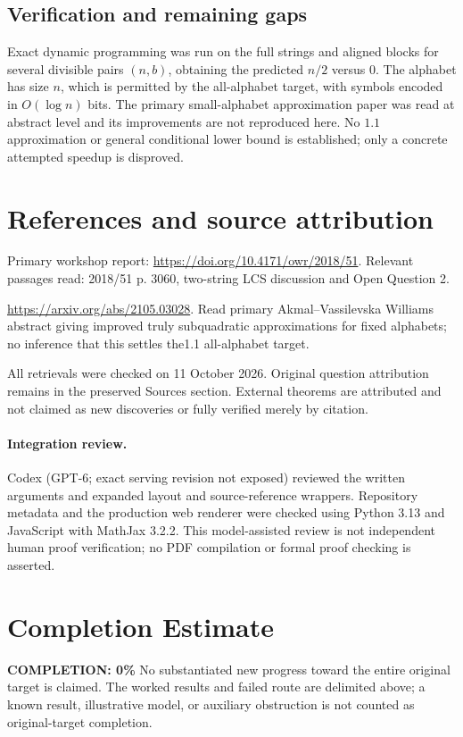 \documentclass[11pt]{article}
\begin{document}
\subsection{Verification and remaining gaps}
Exact dynamic programming was run on the full strings and aligned blocks for several divisible pairs $(n,b)$, obtaining the predicted $n/2$ versus 0. The alphabet has size $n$, which is permitted by the all-alphabet target, with symbols encoded in $O(\log n)$ bits. The primary small-alphabet approximation paper was read at abstract level and its improvements are not reproduced here. No $1.1$ approximation or general conditional lower bound is established; only a concrete attempted speedup is disproved.

\section{References and source attribution}
Primary workshop report: \url{https://doi.org/10.4171/owr/2018/51}. Relevant passages read: 2018/51 p. 3060, two-string LCS discussion and Open Question 2.

\url{https://arxiv.org/abs/2105.03028}. Read primary Akmal--Vassilevska Williams abstract giving improved truly subquadratic approximations for fixed alphabets; no inference that this settles the1.1 all-alphabet target.

All retrievals were checked on 11 October 2026. Original question attribution remains in the preserved Sources section. External theorems are attributed and not claimed as new discoveries or fully verified merely by citation.


\paragraph{Integration review.} Codex (GPT-6; exact serving revision not exposed) reviewed the written arguments and expanded layout and source-reference wrappers. Repository metadata and the production web renderer were checked using Python 3.13 and JavaScript with MathJax 3.2.2. This model-assisted review is not independent human proof verification; no PDF compilation or formal proof checking is asserted.

\section{Completion Estimate}
\noindent\textbf{COMPLETION: 0\%}
No substantiated new progress toward the entire original target is claimed. The worked results and failed route are delimited above; a known result, illustrative model, or auxiliary obstruction is not counted as original-target completion.
\end{document}
